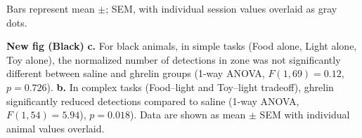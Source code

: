 Bars represent mean $\pm$; SEM, with individual session values overlaid as gray dots.

\textbf{New fig (Black)} \textbf{c.} For black animals, in simple tasks (Food alone, Light alone, Toy alone), the normalized number of detections in zone was not significantly different between saline and ghrelin groups (1-way ANOVA, $F(1,69)=0.12$, $p=0.726$). \textbf{b.} In complex tasks (Food–light and Toy–light tradeoff), ghrelin significantly reduced detections compared to saline (1-way ANOVA, $F(1,54)=5.94$), $p=0.018$). Data are shown as mean $\pm$ SEM with individual animal values overlaid.